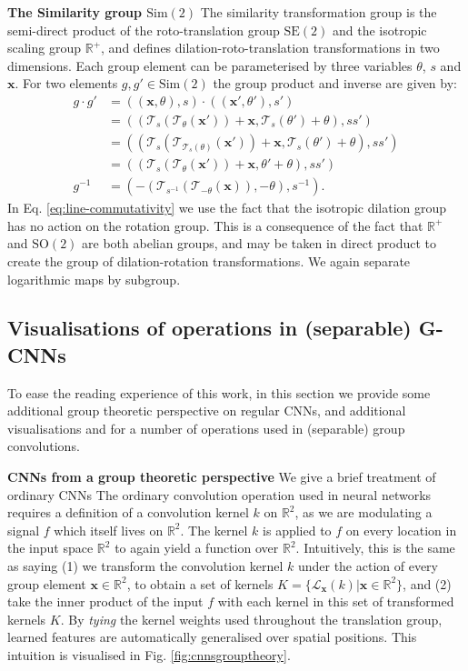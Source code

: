 \documentclass[nohyperref]{article}
\theoremstyle{plain}
\theoremstyle{definition}
\theoremstyle{remark}
\begin{document}
\textbf{The Similarity group $\text{Sim}(2)$}
The similarity transformation group is the semi-direct product of the roto-translation group $\text{SE}(2)$ and the isotropic scaling group $\mathbb{R}^+$, and defines dilation-roto-translation transformations in two dimensions. Each group element can be parameterised by three variables $\theta$, $s$ and $\mathbf{x}$. For two elements $g, g' \in \text{Sim}(2)$ the group product and inverse are given by:
\begin{align}
    g \cdot g' &= ((\mathbf{x}, \theta), s) \cdot ((\mathbf{x}', \theta'), s') \nonumber\\
    &= ((\mathcal{T}_s(\mathcal{T}_\theta(\mathbf{x}')) + \mathbf{x}, \mathcal{T}_s(\theta') + \theta), s  s')  \nonumber\\
    &= ((\mathcal{T}_{s}(\mathcal{T}_{\mathcal{T}_s(\theta)}(\mathbf{x}')) + \mathbf{x}, \mathcal{T}_s(\theta') + \theta), s  s')  \nonumber\\
    \label{eq:line-commutativity}&= ((\mathcal{T}_s(\mathcal{T}_\theta(\mathbf{x}')) + \mathbf{x}, \theta' + \theta), s  s')\\
    g^{-1} &= (-(\mathcal{T}_{s^{-1}}(\mathcal{T}_{-\theta}(\mathbf{x})), -\theta), s^{-1}).
\end{align}
In Eq. \ref{eq:line-commutativity} we use the fact that the isotropic dilation group has no action on the rotation group. This is a consequence of the fact that $\mathbb{R}^+$ and $\text{SO}(2)$ are both abelian groups, and may be taken in direct product to create the group of dilation-rotation transformations. We again separate logarithmic maps by subgroup.

\subsection{Visualisations of operations in (separable) G-CNNs}
To ease the reading experience of this work, in this section we provide some additional group theoretic perspective on regular CNNs, and additional visualisations and for a number of operations used in (separable) group convolutions.

\textbf{CNNs from a group theoretic perspective} \label{app:cnnsgrouptheory} We give a brief treatment of ordinary CNNs  The ordinary convolution operation used in neural networks requires a definition of a convolution kernel $k$ on $\mathbb{R}^2$, as we are modulating a signal $f$ which itself lives on $\mathbb{R}^2$. The kernel $k$ is applied to $f$ on every location in the input space $\mathbb{R}^2$ to again yield a function over $\mathbb{R}^2$. Intuitively, this is the same as saying (1) we transform the convolution kernel $k$ under the action of every group element $\boldsymbol{x} \in \mathbb{R}^2$, to obtain a set of kernels $K=\{ \mathcal{L}_{\boldsymbol{x}}(k) | \boldsymbol{x} \in \mathbb{R}^2\}$, and (2) take the inner product of the input $f$ with each kernel in this set of transformed kernels $K$. By \textit{tying} the kernel weights used throughout the translation group, learned features are automatically generalised over spatial positions. This intuition is visualised in Fig. \ref{fig:cnnsgrouptheory}.
\end{document}

